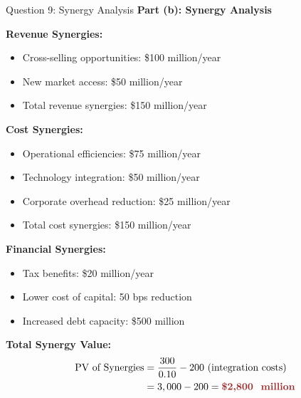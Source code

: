 \documentclass[aspectratio=169]{beamer}
\newcommand{\question}[1]{{\large\bfseries\color{crimson}#1}}
\newcommand{\highlight}[1]{\textcolor{crimson}{\textbf{#1}}}
\begin{document}
	\begin{frame}{Question 9: Synergy Analysis}
		\question{Part (b): Synergy Analysis}
		
		\textbf{Revenue Synergies:}
		\begin{itemize}
			\item Cross-selling opportunities: \$100 million/year
			\item New market access: \$50 million/year
			\item Total revenue synergies: \$150 million/year
		\end{itemize}
		
		\textbf{Cost Synergies:}
		\begin{itemize}
			\item Operational efficiencies: \$75 million/year
			\item Technology integration: \$50 million/year
			\item Corporate overhead reduction: \$25 million/year
			\item Total cost synergies: \$150 million/year
		\end{itemize}
		
		\textbf{Financial Synergies:}
		\begin{itemize}
			\item Tax benefits: \$20 million/year
			\item Lower cost of capital: 50 bps reduction
			\item Increased debt capacity: \$500 million
		\end{itemize}
		
		\textbf{Total Synergy Value:}
		\begin{align*}
			\text{PV of Synergies} &= \frac{300}{0.10} - 200 \text{ (integration costs)} \\
			&= 3,000 - 200 = \highlight{\$2,800 \text{ million}}
		\end{align*}
	\end{frame}
	
\end{document}
